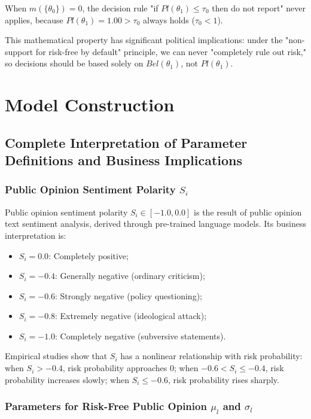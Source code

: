 \documentclass[11pt,a4paper]{report}
\begin{document}
\begin{corollary}
When $m(\{\theta_0\}) = 0$, the decision rule "if $Pl(\theta_1) \leq \tau_0$ then do not report" never applies, because $Pl(\theta_1) = 1.00 > \tau_0$ always holds ($\tau_0 < 1$).

This mathematical property has significant political implications: under the "non-support for risk-free by default" principle, we can never "completely rule out risk," so decisions should be based solely on $Bel(\theta_1)$, not $Pl(\theta_1)$.
\end{corollary}

\section{Model Construction}

\subsection{Complete Interpretation of Parameter Definitions and Business Implications}

\subsubsection{Public Opinion Sentiment Polarity $S_i$}

Public opinion sentiment polarity $S_i \in [-1.0, 0.0]$ is the result of public opinion text sentiment analysis, derived through pre-trained language models. Its business interpretation is:
\begin{itemize}
    \item $S_i = 0.0$: Completely positive;
    \item $S_i = -0.4$: Generally negative (ordinary criticism);
    \item $S_i = -0.6$: Strongly negative (policy questioning);
    \item $S_i = -0.8$: Extremely negative (ideological attack);
    \item $S_i = -1.0$: Completely negative (subversive statements).
\end{itemize}

Empirical studies show that $S_i$ has a nonlinear relationship with risk probability: when $S_i > -0.4$, risk probability approaches 0; when $-0.6 < S_i \leq -0.4$, risk probability increases slowly; when $S_i \leq -0.6$, risk probability rises sharply.

\subsubsection{Parameters for Risk-Free Public Opinion $\mu_l$ and $\sigma_l$}
\end{document}
